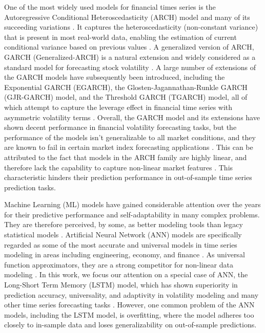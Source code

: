 One of the most widely used models for financial times series is the Autoregressive Conditional Heteroscedasticity (ARCH) model and many of its succeeding variations \cite{koo_hybrid_2022, engle_autoregressive_1982, alam_forecasting_2013}. It captures the heteroscedasticity (non-constant variance) that is present in most real-world data, enabling the estimation of current conditional variance based on previous values \cite{kim_forecasting_2018, engle_autoregressive_1982}. A generalized version of ARCH, GARCH (Generalized-ARCH) is a natural extension and widely considered as a standard model for forecasting stock volatility \cite{bollerslev_generalized_1986, hansen_forecast_2005, franses_forecasting_1996}. A large number of extensions of the GARCH models have subsequently been introduced, including the Exponential GARCH (EGARCH), the Glosten-Jagannathan-Runkle GARCH (GJR-GARCH) model, and the Threshold GARCH (TGARCH) model, all of which attempt to capture the leverage effect in financial time series with asymmetric volatility terms \cite{nelson_conditional_1991, glosten_relation_1993, zakoian_threshold_1994, kluppelberg_continuous-time_2004, li_zd-garch_2018}. Overall, the GARCH model and its extensions have shown decent performance in financial volatility forecasting tasks, but the performance of the models isn’t generalizable to all market conditions, and they are known to fail in certain market index forecasting applications \cite{franses_forecasting_1996, liu_volatility_2009, lee_are_1991, mcmillan_forecasting_2000}. This can be attributed to the fact that models in the ARCH family are highly linear, and therefore lack the capability to capture non-linear market features \cite{koo_hybrid_2022, lee_are_1991}. This characteristic hinders their prediction performance in out-of-sample time series prediction tasks. 

Machine Learning (ML) models have gained considerable attention over the years for their predictive performance and self-adaptability in many complex problems. They are therefore perceived, by some, as better modeling tools than legacy statistical models \cite{yu_neural-network-based_2009, ahmed_empirical_2010, shen_novel_2020}. Artificial Neural Network (ANN) models are specifically regarded as some of the most accurate and universal models in time series modeling in areas including engineering, economy, and finance \cite{kohzadi_comparison_1996, khashei_artificial_2010, zhang_neural_2005}. As universal function approximators, they are a strong competitor for non-linear data modeling \cite{kim_forecasting_2018, koo_hybrid_2022, ciuca_layered_1997, schafer_recurrent_2006}. In this work, we focus our attention on a special case of ANN, the Long-Short Term Memory (LSTM) model, which has shown superiority in prediction accuracy, universality, and adaptivity in volatility modeling and many other time series forecasting tasks \cite{kim_forecasting_2018, gamboa_deep_2017, hochreiter_long_1997, maknickiene_application_2012, chen_lstm-based_2015}. However, one common problem of the ANN models, including the LSTM model, is overfitting, where the model adheres too closely to in-sample data and loses generalizability on out-of-sample predictions. 

